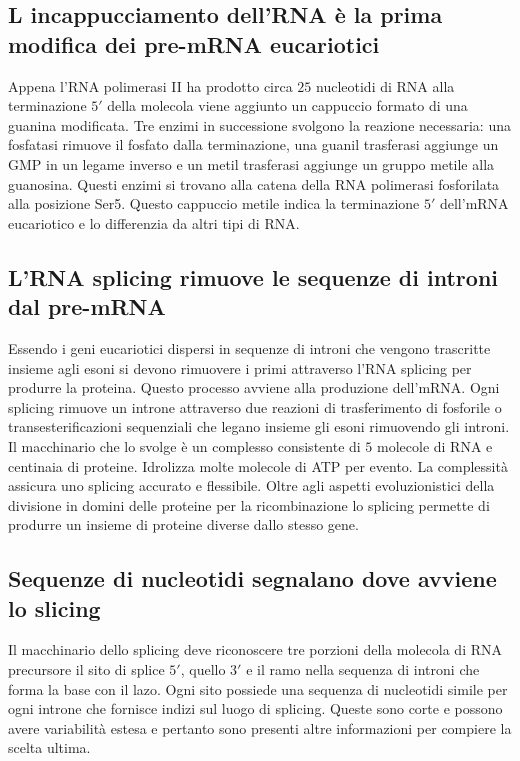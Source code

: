 \subsection{L incappucciamento dell'RNA \`e la prima modifica dei pre-mRNA eucariotici}
Appena l'RNA polimerasi II ha prodotto circa $25$ nucleotidi di RNA alla terminazione $5'$ della molecola viene aggiunto un cappuccio formato di una guanina modificata. Tre enzimi in 
successione svolgono la reazione necessaria: una fosfatasi rimuove il fosfato dalla terminazione, una guanil trasferasi aggiunge un GMP in un legame inverso e un metil trasferasi
aggiunge un gruppo metile alla guanosina. Questi enzimi si trovano alla catena della RNA polimerasi fosforilata alla posizione Ser5. Questo cappuccio metile indica la terminazione
$5'$ dell'mRNA eucariotico e lo differenzia da altri tipi di RNA. 
\subsection{L'RNA splicing rimuove le sequenze di introni dal pre-mRNA}
Essendo i geni eucariotici dispersi in sequenze di introni che vengono trascritte insieme agli esoni si devono rimuovere i primi attraverso l'RNA splicing per produrre la proteina.
Questo processo avviene alla produzione dell'mRNA. Ogni splicing rimuove un introne attraverso due reazioni di trasferimento di fosforile o transesterificazioni sequenziali che legano 
insieme gli esoni rimuovendo gli introni. Il macchinario che lo svolge \`e un complesso consistente di $5$ molecole di RNA e centinaia di proteine. Idrolizza molte molecole di ATP per
evento. La complessit\`a assicura uno splicing accurato e flessibile. Oltre agli aspetti evoluzionistici della divisione in domini delle proteine per la ricombinazione lo splicing
permette di produrre un insieme di proteine diverse dallo stesso gene. 
\subsection{Sequenze di nucleotidi segnalano dove avviene lo slicing}
Il macchinario dello splicing deve riconoscere tre porzioni della molecola di RNA precursore il sito di splice $5'$, quello $3'$ e il ramo nella sequenza di introni che forma la base
con il lazo. Ogni sito possiede una sequenza di nucleotidi simile per ogni introne che fornisce indizi sul luogo di splicing. Queste sono corte e possono avere variabilit\`a estesa e 
pertanto sono presenti altre informazioni per compiere la scelta ultima. 
